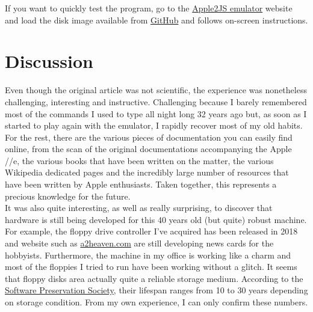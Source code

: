 If you want to quickly test the program, go to
the \href{https://www.scullinsteel.com/apple2/}{Apple2JS emulator} website and
load the disk image available from \url{GitHub} and follows on-screen
instructions.

\section*{Discussion}

Even though the original article was not scientific, the experience was
nonetheless challenging, interesting and instructive. Challenging because I
barely remembered most of the commands I used to type all night long 32 years
ago but, as soon as I started to play again with the emulator, I rapidly
recover most of my old habits. For the rest, there are the various pieces of
documentation you can easily find online, from the scan of the original
documentations accompanying the Apple //e, the various books that have been
written on the matter, the various Wikipedia dedicated pages and the incredibly
large number of resources that have been written by Apple enthusiasts. Taken
together, this represents a precious knowledge for the future.\\

It was also quite interesting, as well as really surprising, to discover that
hardware is still being developed for this 40 years old (but quite) robust
machine. For example, the floppy drive controller I've acquired has been
released in 2018 and website such
as \href{https://www.a2heaven.com}{a2heaven.com} are still developing news
cards for the hobbyists. Furthermore, the machine in my office is working like a
charm and most of the floppies I tried to run have been working without a
glitch. It seems that floppy disks area actually quite a reliable storage
medium. According to the \href{http://www.softpres.org/}{Software Preservation
Society}, their lifespan ranges from 10 to 30 years depending on storage
condition\supercite{lowood:2009}. From my own experience, I can only confirm
these numbers.\\

